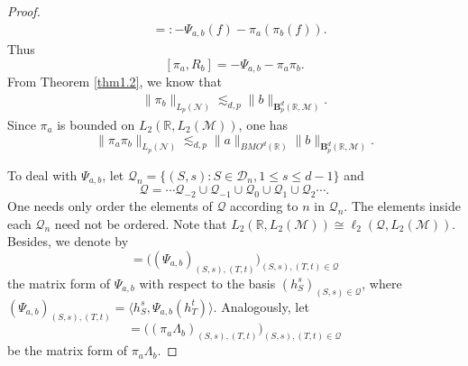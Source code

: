 \documentclass[oneside,english,a4wide]{amsart}
\numberwithin{equation}{section}
\numberwithin{figure}{section}
\theoremstyle{plain}
\theoremstyle{plain}
\theoremstyle{definition}
\theoremstyle{plain}
\theoremstyle{remark}
\theoremstyle{definition}
\theoremstyle{remark}
\theoremstyle{definition}
\newcommand{\M}{{\mathcal M}}
\newcommand{\8}{\infty}
\begin{document}
\begin{proof}
\begin{equation*}
\begin{aligned}
			&=: -\varPsi_{a,b}(f)-\pi_{a}(\pi_b(f)).
		\end{aligned}
	\end{equation*}
	Thus
	\begin{equation}\label{piarb}
		[\pi_{a}, R_b]=-\varPsi_{a,b}-\pi_{a}\pi_b.
	\end{equation}
	From Theorem \ref{thm1.2}, we know that
	\begin{equation*}
		\begin{aligned}
			\|\pi_b\|_{L_p(\mathcal{N})}\lesssim_{d, p}\|b\|_{\pmb{B}_p^{d}(\mathbb{R},\mathcal{M})}.
		\end{aligned}
	\end{equation*}
	Since $\pi_a$ is bounded on $L_2(\mathbb{R}, L_2(\M))$, one has
	\begin{equation}\label{piarb1}
		\|\pi_a\pi_b\|_{L_p(\mathcal{N})}\lesssim_{d, p}\|a\|_{BMO^d(\mathbb{R})}\|b\|_{\pmb{B}_p^{d}(\mathbb{R},\mathcal{M})}.
	\end{equation}
	
	To deal with $\varPsi_{a,b}$, let $\mathcal{Q}_n=\big\{(S,s):S\in\mathcal{D}_n,1\le s\le d-1\big\}$ and 
	\begin{equation*}
		\mathcal{Q}=\cdots \mathcal{Q}_{-2}\cup \mathcal{Q}_{-1}\cup \mathcal{Q}_{0}\cup \mathcal{Q}_{1}\cup \mathcal{Q}_{2}\cdots.
	\end{equation*}
    One needs only order the elements of $\mathcal{Q}$ according to $n$ in $\mathcal{Q}_n$. The elements inside each $\mathcal{Q}_n$ need not be ordered. Note that $L_2(\mathbb{R},L_2(\mathcal{M}))\cong \ell_2(\mathcal{Q}, L_2(\mathcal{M}))$. Besides, we denote by
	\begin{equation*}
		[\varPsi_{a,b}]=\biggl((\varPsi_{a,b})_{(S,s),(T,t)}\biggr)_{(S,s),(T,t)\in \mathcal{Q}}
	\end{equation*}
	the matrix form of $\varPsi_{a,b}$ with respect to the basis $(h_S^s)_{(S,s)\in \mathcal{Q}}$, where
	$(\varPsi_{a,b})_{(S,s),(T,t)}=\langle h_S^s,\varPsi_{a,b} (h_T^t)\rangle$. Analogously, let
	\begin{equation*}
		[\pi_a\varLambda_b]=\biggl((\pi_a\varLambda_b)_{(S,s),(T,t)}\biggr)_{(S,s),(T,t)\in \mathcal{Q}}
	\end{equation*}
	be the matrix form of $\pi_a\varLambda_b$.
	

\end{proof}
\end{document}
